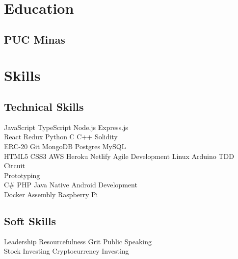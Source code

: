 \documentclass[]{morris-resume-openfont}
\begin{document}
\begin{minipage}[t]{0.49\textwidth}

\section{Education} 

\subsection{PUC Minas}
\sectionsep


\section{Skills}
\subsection{Technical Skills}
JavaScript \textbullet{} TypeScript \textbullet{} Node.js \textbullet{} Express.js \\
React \textbullet{} Redux \textbullet{} Python \textbullet{} C \textbullet{} C++ \textbullet{} Solidity \\ ERC-20 \textbullet{} Git \textbullet{} MongoDB \textbullet{} Postgres \textbullet{} MySQL \\ HTML5 \textbullet{} CSS3 \textbullet{} AWS \textbullet{} Heroku \textbullet{} Netlify \textbullet{} Agile Development \textbullet{} Linux \textbullet{} Arduino \textbullet{} TDD \textbullet{} Circuit\\Prototyping \\
C\# \textbullet{} PHP \textbullet{} Java \textbullet{} Native Android Development \\ Docker \textbullet{} Assembly \textbullet{} Raspberry Pi
\sectionsep

\subsection{Soft Skills}
Leadership \textbullet{} Resourcefulness \textbullet{} Grit \textbullet{} Public Speaking \\
Stock Investing \textbullet{} Cryptocurrency Investing
\sectionsep


\end{minipage}
\end{document}
